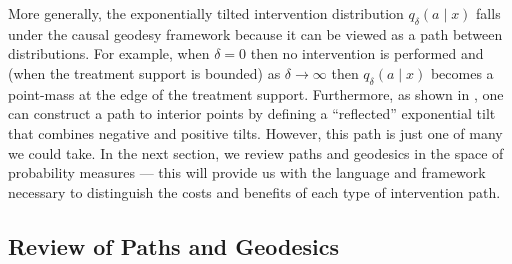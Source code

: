 \documentclass[11pt,twoside]{article}
\theoremstyle{definition}
\theoremstyle{remark}
\begin{document}
More generally, the exponentially tilted intervention distribution $q_\delta(a \! \mid \! x)$ falls under the causal geodesy framework because it can be viewed as a path between distributions. For example, when $\delta = 0$ then no intervention is performed and (when the treatment support is bounded) as $\delta \to \infty$  then $q_\delta(a \! \mid \! x)$ becomes a point-mass at the edge of the treatment support. Furthermore, as shown in \cite{schindl2024incremental}, one can construct a path to interior points by defining a ``reflected'' exponential tilt that combines negative and positive tilts. However, this path is just one of many we could take. In the next section, we review paths and geodesics in the space of probability measures --- this will provide us with the language and framework necessary to distinguish the costs and benefits of each type of intervention path.


\subsection{Review of Paths and Geodesics} \label{geodesic_introduction}
\end{document}
